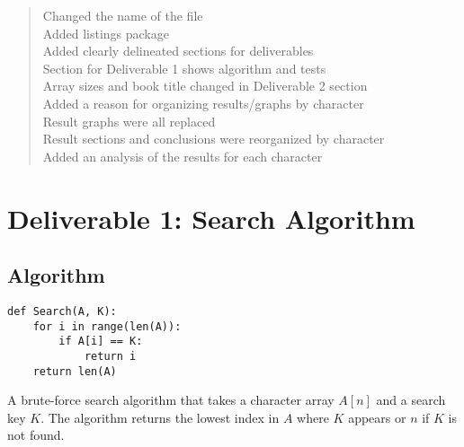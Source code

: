 \documentclass{article}
\begin{document}
\begin{quote}
Changed the name of the file\\
Added listings package \\
Added clearly delineated sections for deliverables \\
Section for Deliverable 1 shows algorithm and tests \\
Array sizes and book title changed in Deliverable 2 section \\
Added a reason for organizing results/graphs by character \\
Result graphs were all replaced \\
Result sections and conclusions were reorganized by character \\
Added an analysis of the results for each character
\end{quote}

\section{Deliverable 1: Search Algorithm}
\subsection{Algorithm}
\lstset{language=Python}
\begin{lstlisting}
def Search(A, K):
    for i in range(len(A)):
        if A[i] == K:
            return i
    return len(A)
\end{lstlisting}
A brute-force search algorithm that takes a character array \( A[n] \) and a search key \( K \). The algorithm returns the lowest index in \( A \) where \( K \) appears or \( n \) if \( K \) is not found.
\end{document}
